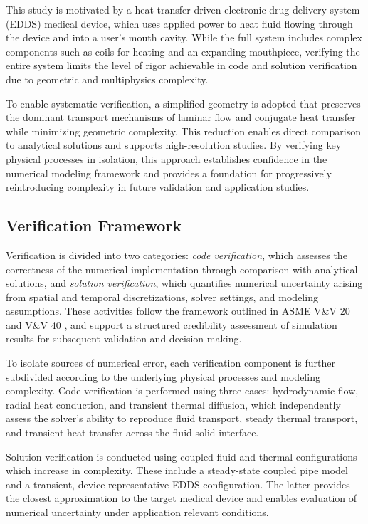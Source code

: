 This study is motivated by a heat transfer driven electronic drug delivery system (EDDS) medical device, which uses applied power to heat fluid flowing through the device and into a user's mouth cavity. While the full system includes complex components such as coils for heating and an expanding mouthpiece, verifying the entire system limits the level of rigor achievable in code and solution verification due to geometric and multiphysics complexity. 

To enable systematic verification, a simplified geometry is adopted that preserves the dominant transport mechanisms of laminar flow and conjugate heat transfer while minimizing geometric complexity. This reduction enables direct comparison to analytical solutions and supports high-resolution studies. By verifying key physical processes in isolation, this approach establishes confidence in the numerical modeling framework and provides a foundation for progressively reintroducing complexity in future validation and application studies.

\subsection{Verification Framework}
Verification is divided into two categories: \textit{code verification}, which assesses the correctness of the numerical implementation through comparison with analytical solutions, and \textit{solution verification}, which quantifies numerical uncertainty arising from spatial and temporal discretizations, solver settings, and modeling assumptions. These activities follow the framework outlined in ASME V\&V 20 and V\&V 40 \cite{vv20,vv40}, and support a structured credibility assessment of simulation results for subsequent validation and decision-making.

To isolate sources of numerical error, each verification component is further subdivided according to the underlying physical processes and modeling complexity. Code verification is performed using three cases: hydrodynamic flow, radial heat conduction, and transient thermal diffusion, which independently assess the solver’s ability to reproduce fluid transport, steady thermal transport, and transient heat transfer across the fluid-solid interface. 

Solution verification is conducted using coupled fluid and thermal configurations which increase in complexity. These include a steady-state coupled pipe model and a transient, device-representative EDDS configuration. The latter provides the closest approximation to the target medical device and enables evaluation of numerical uncertainty under application relevant conditions.

